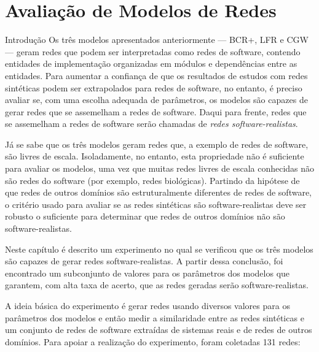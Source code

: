 %	
%

\chapter{Avaliação de Modelos de Redes} \label{cap:avaliacao}


\begin{section}{Introdução}
Os três modelos apresentados anteriormente --- BCR+, LFR e CGW --- geram redes que podem ser interpretadas como redes de software, contendo entidades de implementação organizadas em módulos e dependências entre as entidades. Para aumentar a confiança de que os resultados de estudos com redes sintéticas podem ser extrapolados para redes de software, no entanto, é preciso avaliar se, com uma escolha adequada de parâmetros, os modelos são capazes de gerar redes que se assemelham a redes de software. Daqui para frente, redes que se assemelham a redes de software serão chamadas de \emph{redes software-realistas}.

Já se sabe que os três modelos geram redes que, a exemplo de redes de software, são livres de escala. Isoladamente, no entanto, esta propriedade não é suficiente para avaliar os modelos, uma vez que muitas redes livres de escala conhecidas não são redes do software (por exemplo, redes biológicas). Partindo da hipótese de que redes de outros domínios são estruturalmente diferentes de redes de software, o critério usado para avaliar se as redes sintéticas são software-realistas deve ser robusto o suficiente para determinar que redes de outros domínios não são software-realistas.

Neste capítulo é descrito um experimento no qual se verificou que os três modelos são capazes de gerar redes software-realistas. A partir dessa conclusão, foi encontrado um subconjunto de valores para os parâmetros dos modelos que garantem, com alta taxa de acerto, que as redes geradas serão software-realistas.

A ideia básica do experimento é gerar redes usando diversos valores para os parâmetros dos modelos e então medir a similaridade entre as redes sintéticas e um conjunto de redes de software extraídas de sistemas reais e de redes de outros domínios. Para apoiar a realização do experimento, foram coletadas 131 redes:


\end{section}
